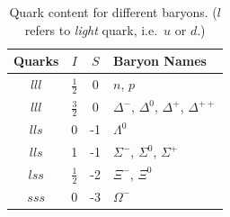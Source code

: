     \begin{table}
        \centering
        \begin{tabular}{c|cc|l}
            Quarks & $I$           & $S$ & Baryon Names\\
            \hline
            $lll$    & $\frac{1}{2}$ &  0  & $n$, $p$\\
            $lll$    & $\frac{3}{2}$ &  0  & $\Delta^-$, $\Delta^0$, $\Delta^+$, $\Delta^{++}$\\
            $lls$    & 0             & -1  & $\Lambda^0$\\
            $lls$    & 1             & -1  & $\Sigma^-$, $\Sigma^0$, $\Sigma^+$\\
            $lss$    & $\frac{1}{2}$ & -2  & $\Xi^-$, $\Xi^0$\\
            $sss$    & 0             & -3  & $\Omega^-$
        \end{tabular}
        \caption{Quark content for different baryons. ($l$ refers to \emph{light} quark, i.e.\ $u$ or $d$.)}
        \label{table:baryon_names}
    \end{table}
